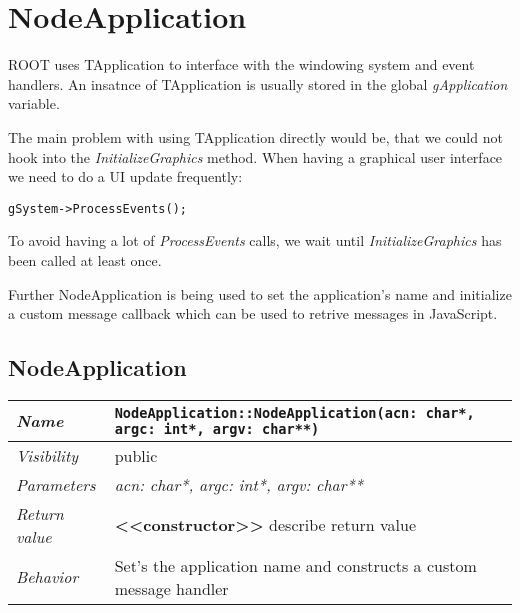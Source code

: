 \chapter{NodeApplication}
ROOT uses TApplication to interface with the windowing system and event handlers.
An insatnce of TApplication is usually stored in the global \textit{gApplication} variable.

The main problem with using TApplication directly would be, that we could not hook into the \textit{InitializeGraphics} method.
When having a graphical user interface we need to do a UI update frequently:
\begin{verbatim}
gSystem->ProcessEvents();
\end{verbatim}
To avoid having a lot of \textit{ProcessEvents} calls, we wait until \textit{InitializeGraphics} has been called at least once.

Further NodeApplication is being used to set the application's name and initialize a custom message callback which can be used to retrive messages in JavaScript.

\section{NodeApplication}
\begin{longtable}{p{3cm} @{\hskip 1cm} p{12cm}}
 \hline
\textit{Name} & \texttt{NodeApplication::NodeApplication(acn: char*, argc: int*, argv: char**)}\\
\hline
 \textit{Visibility} & public\\
\hline
\textit{Parameters} & \textit{acn: char*, argc: int*, argv: char**}\\
\hline
\textit{Return value} & \textbf{ <<constructor>>} describe return value\\
  \hline
 \textit{Behavior} & Set's the application name and constructs a custom message handler \\
\hline
\end{longtable} \pagebreak
